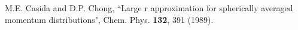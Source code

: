 \begin{thebibliography}{9}
M.E. Casida and D.P. Chong, 
``Large r approximation for spherically averaged momentum distributions",
Chem. Phys. {\bf 132}, 391 (1989).

\begin{comment}


\bibitem{Cinal:10}
M. Cinal, 
``Direct mapping between exchange potentials of Hartree--Fock and 
Kohn--Sham schemes as origin of orbital proximity'', 
Jour. Chem. Phys. {\bf 132}, 014101 (2010).

\bibitem{Becke:88}
A.D. Becke, 
``Density--functional exchange--energy approximation with correct 
asymptotic behavior", 
Phys. Rev. A {\bf 38}, 3098 (1988).

\bibitem{Weber:71}
T.A. Weber and R.G. Parr, 
``Hartree--Fock theory with exchange cutoff'', 
Phys. Rev. A {\bf 3}, 81 (1971).
 
\bibitem{Weber:70}
T.A. Weber, N.C. Handy, and R.G. Parr, 
``SelfConsistenfField atomic wavefunctions from efficient nested 
basis sets", 
J. of Chem. Phys. {\bf 52}, 1501 (1970).

\bibitem{Amusia:04}
M.Ya. Amusia, A.Z. Msezane, V.R. Shaginyan, and D. Sokolovski, 
``On the relation between the Hartree--Fock and Kohn--Sham
approaches'',
Phys. Lett. A {\bf 330}, 10 (2015).


\bibitem{HohenberKohn:64}
P. Hohenberg, W. Kohn, 
Phys. Rev., \textbf{136}, B864 (1964).

\bibitem{KohnSham:65}
W. Kohn, L. J. Sham, 
Phys. Rev. \textbf{140}, A1133 (1965).


\bibitem{Becke:14} 
A. D. Becke,
J. Chem. Phys. \textbf{140}, 18A301 (2014).

\bibitem{Bartlett:10} 
R. J. Bartlett, 
Mol. Phys. \textbf{108}, 3299-3311 (2010).

\bibitem{Verma:12} 
P. Verma, R. J. Bartlett,
J. Chem. Phys. \textbf{137}, 134102 (2012).

\bibitem{Mura:97}
M. E. Mura, P. J. Knowles, C. A. Reynolds, 
J. Chem. Phys. \textbf{106}, 9659--9667 (1997).

\bibitem{Umrigar:94} 
C. J. Umrigar, X. Gonze,
Phys. Rev. A \textbf{50}, 3827 (1994).

\bibitem{Gritsenko:97} 
O. V. Gritsenko, E. J. Baerends, 
Theor. Chem. Acc. \textbf{96}, 44 (1997).


\end{comment}
\end{thebibliography}
